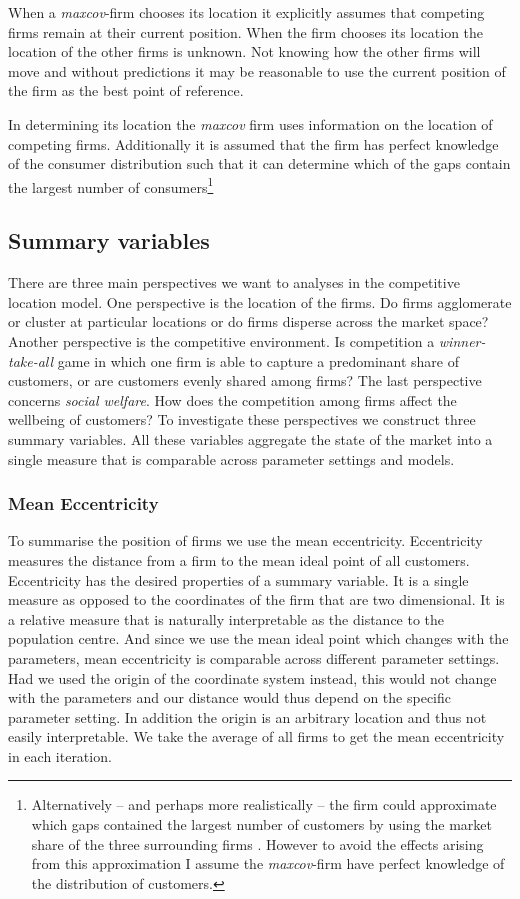 \documentclass[preprint, 12pt]{elsarticle}
\begin{document}
When a \emph{maxcov}-firm chooses its location it explicitly assumes that competing firms remain at their current position. When the firm chooses its location the location of the other firms is unknown. Not knowing how the other firms will move and without predictions it may be reasonable to use the current position of the firm as the best point of reference.

In determining its location the \emph{maxcov} firm uses information on the location of competing firms. Additionally it is assumed that the firm has perfect knowledge of the consumer distribution such that it can determine which of the gaps contain the largest number of consumers\footnote{Alternatively -- and perhaps more realistically -- the firm could approximate which gaps contained the largest number of customers by using the market share of the three surrounding firms \citep[p.~75]{Fowler_Laver_2008}. However to avoid the effects arising from this approximation I assume the \emph{maxcov}-firm have perfect knowledge of the distribution of customers.}

\subsection{Summary variables}

There are three main perspectives we want to analyses in the competitive location model. One perspective is the location of the firms. Do firms agglomerate or cluster at particular locations or do firms disperse across the market space? Another perspective is the competitive environment. Is competition a \emph{winner-take-all} game in which one firm is able to capture a predominant share of customers, or are customers evenly shared among firms? The last perspective concerns \emph{social welfare}. How does the competition among firms affect the wellbeing of customers? To investigate these perspectives we construct three summary variables. All these variables aggregate the state of the market into a single measure that is comparable across parameter settings and models.

\subsubsection{Mean Eccentricity}
To summarise the position of firms we use the mean eccentricity. Eccentricity measures the distance from a firm to the mean ideal point of all customers. Eccentricity has the desired properties of a summary variable. It is a single measure as opposed to the coordinates of the firm that are two dimensional. It is a relative measure that is naturally interpretable as the distance to the population centre. And since we use the mean ideal point which changes with the parameters, mean eccentricity is comparable across different parameter settings. Had we used the origin of the coordinate system instead, this would not change with the parameters and our distance would thus depend on the specific parameter setting. In addition the origin is an arbitrary location and thus not easily interpretable. We take the average of all firms to get the mean eccentricity in each iteration.
\end{document}
